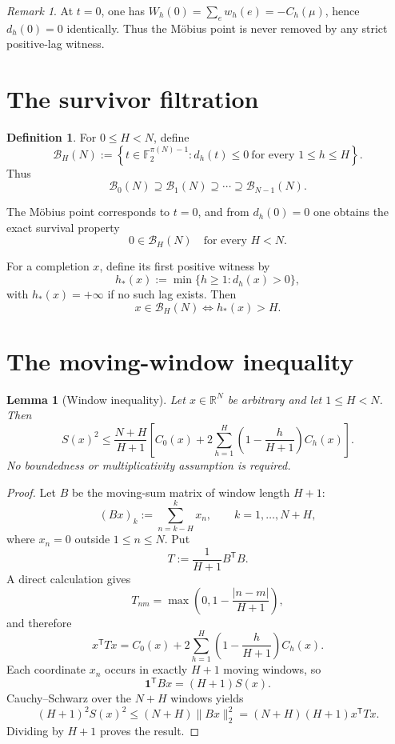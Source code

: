 \documentclass[11pt]{article}
\newtheorem{lemma}[theorem]{Lemma}
\theoremstyle{definition}
\newtheorem{definition}[theorem]{Definition}
\theoremstyle{remark}
\newtheorem{remark}[theorem]{Remark}
\newcommand{\Ftwo}{\mathbb F_2}
\newcommand{\BH}{\mathcal B}
\begin{document}
\begin{remark}
At $t=0$, one has $W_h(0)=\sum_e w_h(e)=-C_h(\mu)$, hence $d_h(0)=0$ identically.  Thus the M\"obius point is never removed by any strict positive-lag witness.
\end{remark}

\section{The survivor filtration}

\begin{definition}
For $0\le H<N$, define
\[
\boxed{
\BH_H(N):=
\left\{t\in\Ftwo^{\pi(N)-1}:d_h(t)\le0\ \text{for every }1\le h\le H\right\}.
}
\]
Thus
\[
\BH_0(N)\supseteq\BH_1(N)\supseteq\cdots\supseteq\BH_{N-1}(N).
\]
\end{definition}

The M\"obius point corresponds to $t=0$, and from $d_h(0)=0$ one obtains the exact survival property
\[
\boxed{\quad 0\in\BH_H(N)\quad\text{for every }H<N.\quad}
\]

For a completion $x$, define its first positive witness by
\[
h_*(x):=\min\{h\ge1:d_h(x)>0\},
\]
with $h_*(x)=+\infty$ if no such lag exists.  Then
\[
x\in\BH_H(N)\iff h_*(x)>H.
\]

\section{The moving-window inequality}

\begin{lemma}[Window inequality]
Let $x\in\mathbb R^N$ be arbitrary and let $1\le H<N$.  Then
\[
\boxed{
S(x)^2\le
\frac{N+H}{H+1}
\left[
C_0(x)+2\sum_{h=1}^{H}
\left(1-\frac{h}{H+1}\right)C_h(x)
\right].
}
\]
No boundedness or multiplicativity assumption is required.
\end{lemma}

\begin{proof}
Let $B$ be the moving-sum matrix of window length $H+1$:
\[
(Bx)_k:=\sum_{n=k-H}^{k}x_n,
\qquad k=1,\dots,N+H,
\]
where $x_n=0$ outside $1\le n\le N$.  Put
\[
T:=\frac1{H+1}B^{\mathsf T}B.
\]
A direct calculation gives
\[
T_{nm}=\max\left(0,1-\frac{|n-m|}{H+1}\right),
\]
and therefore
\[
x^{\mathsf T}Tx
=C_0(x)+2\sum_{h=1}^{H}
\left(1-\frac{h}{H+1}\right)C_h(x).
\]
Each coordinate $x_n$ occurs in exactly $H+1$ moving windows, so
\[
\mathbf 1^{\mathsf T}Bx=(H+1)S(x).
\]
Cauchy--Schwarz over the $N+H$ windows yields
\[
(H+1)^2S(x)^2
\le
(N+H)\|Bx\|_2^2
=(N+H)(H+1)x^{\mathsf T}Tx.
\]
Dividing by $H+1$ proves the result.
\end{proof}
\end{document}
